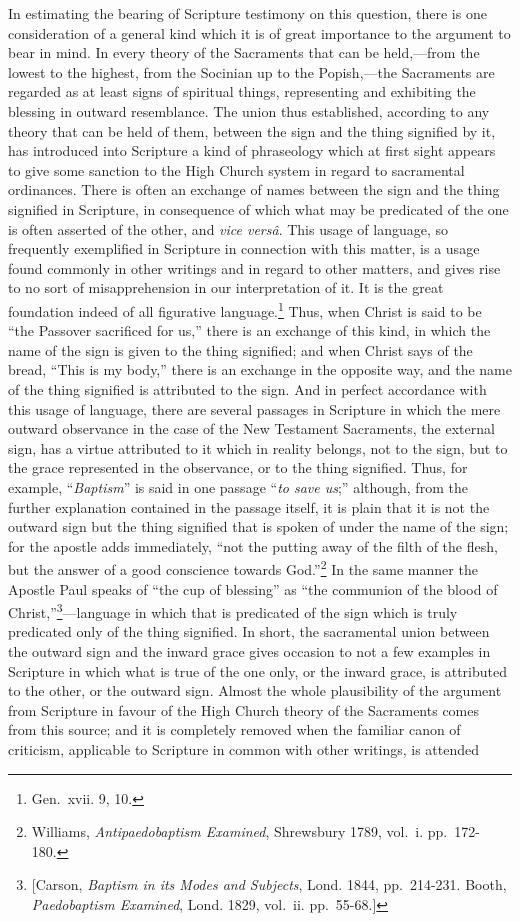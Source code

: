 \documentclass[]{book}
\begin{document}
In estimating the bearing of Scripture testimony on this question, there is one consideration of a general kind which it is of great importance to the argument to bear in mind. In every theory of the Sacraments that can be held,---from the lowest to the highest, from the Socinian up to the Popish,---the Sacraments are regarded as at least signs of spiritual things, representing and exhibiting the blessing in outward resemblance. The union thus established, according to any theory that can be held of them, between the sign and the thing signified by it, has introduced into Scripture a kind of phraseology which at first sight appears to give some sanction to the High Church system in regard to sacramental ordinances. There is often an exchange of names between the sign and the thing signified in Scripture, in consequence of which what may be predicated of the one is often asserted of the other, and \emph{vice versâ}. This usage of language, so frequently exemplified in Scripture in connection with this matter, is a usage found commonly in other writings and in regard to other matters, and gives rise to no sort of misapprehension in our interpretation of it. It is the great foundation indeed of all figurative language.\footnote{Gen.~xvii. 9, 10.} Thus, when Christ is said to be ``the Passover sacrificed for us,'' there is an exchange of this kind, in which the name of the sign is given to the thing signified; and when Christ says of the bread, ``This is my body,'' there is an exchange in the opposite way, and the name of the thing signified is attributed to the sign. And in perfect accordance with this usage of language, there are several passages in Scripture in which the mere outward observance in the case of the New Testament Sacraments, the external sign, has a virtue attributed to it which in reality belongs, not to the sign, but to the grace represented in the observance, or to the thing signified. Thus, for example, ``\emph{Baptism}'' is said in one passage ``\emph{to save us};'' although, from the further explanation contained in the passage itself, it is plain that it is not the outward sign but the thing signified that is spoken of under the name of the sign; for the apostle adds immediately, ``not the putting away of the filth of the flesh, but the answer of a good conscience towards God.''\footnote{Williams, \emph{Antipaedobaptism Examined}, Shrewsbury 1789, vol.~i. pp.~172- 180.} In the same manner the Apostle Paul speaks of ``the cup of blessing'' as ``the communion of the blood of Christ,''\footnote{{[}Carson, \emph{Baptism in its Modes and Subjects}, Lond. 1844, pp.~214-231. Booth, \emph{Paedobaptism Examined}, Lond. 1829, vol.~ii. pp.~55-68.{]}}---language in which that is predicated of the sign which is truly predicated only of the thing signified. In short, the sacramental union between the outward sign and the inward grace gives occasion to not a few examples in Scripture in which what is true of the one only, or the inward grace, is attributed to the other, or the outward sign. Almost the whole plausibility of the argument from Scripture in favour of the High Church theory of the Sacraments comes from this source; and it is completely removed when the familiar canon of criticism, applicable to Scripture in common with other writings, is attended 
\end{document}
